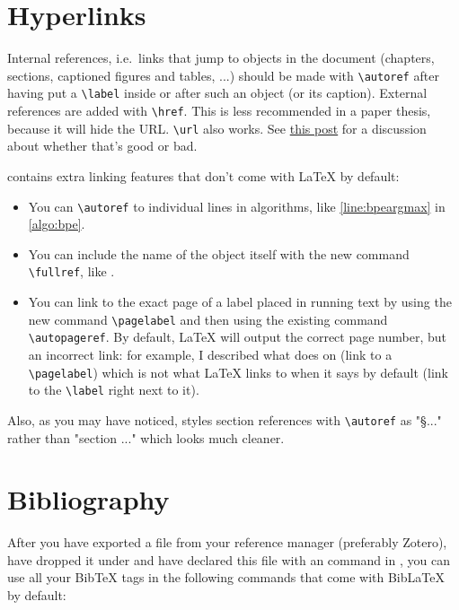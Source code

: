 \section{Hyperlinks}\label{sec:hyperlinks}
Internal references, i.e.\ links that jump to objects in the document (chapters, sections, captioned figures and tables, ...) should be made with \verb|\autoref| after having put a \verb|\label| inside or after such an object (or its caption). External references are added with \verb|\href|. This is less recommended in a paper thesis, because it will hide the URL. \verb|\url| also works. See \href{https://academia.stackexchange.com/q/195802/124578}{this post} for a discussion about whether that's good or bad.

\repo contains extra linking features that don't come with \LaTeX{} by default: 
\begin{itemize}
	\item You can \verb|\autoref| to individual lines in algorithms, like \autoref{line:bpeargmax} in \autoref{algo:bpe}.
	\item You can include the name of the object itself with the new command \verb|\fullref|, like .
	\item You can link to the exact page of a label placed in running text by using the new command \verb|\pagelabel| and then using the existing command \verb|\autopageref|. By default, \LaTeX{} will output the correct page number, but an incorrect link: for example, I described what  does on  (link to a \verb|\pagelabel|) which is not what \LaTeX{} links to when it says  by default (link to the \verb|\label| right next to it).
\end{itemize}
Also, as you may have noticed, \repo styles section references with \verb|\autoref| as "\S..." rather than "section ..." which looks much cleaner.

\section{Bibliography}
After you have exported a  file from your reference manager (preferably \textsf{Zotero}), have dropped it under  and have declared this file with an \verb|| command in , you can use all your Bib\TeX{} tags in the following commands that come with Bib\LaTeX{} by default:

